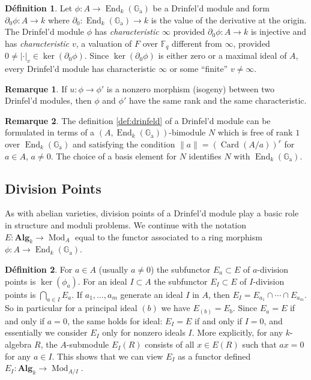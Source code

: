 \documentclass[12pt,a4paper]{article}
\theoremstyle{plain}
\theoremstyle{definition}
\newtheorem{definition}{D\'efinition}[section]
\newtheorem{remark}{Remarque}[section]
\theoremstyle{remark}
\DeclareMathOperator{\End}{End}
\DeclareMathOperator{\Card}{Card}
\DeclareMathOperator{\Mod}{Mod}
\newcommand{\bF}{\mathbb{F}}
\newcommand{\Ga}{\mathbb{G}_\mathrm{a}}
\providecommand{\Ga}{\mathbb{G}_{\mathrm a}}
\providecommand{\End}{\operatorname{End}}
\providecommand{\Alg}{\mathbf{Alg}}
\begin{document}
\begin{definition}
\label{def:characteristic}
Let $\phi: A \to \End_k(\Ga)$ be a Drinfel'd module and form $\partial_0 \phi: A \to k$ where $\partial_0: \End_k(\Ga) \to k$ is the value of the derivative at the origin. The Drinfel'd module $\phi$ has \emph{characteristic $\infty$} provided $\partial_0 \phi: A \to k$ is injective and has \emph{characteristic $v$}, a valuation of $F$ over $\bF_q$ different from $\infty$, provided $0 \neq |\cdot|_v \in \ker(\partial_0 \phi)$. Since $\ker(\partial_0 \phi)$ is either zero or a maximal ideal of $A$, every Drinfel'd module has characteristic $\infty$ or some ``finite'' $v \neq \infty$.
\end{definition}

\begin{remark}
\label{rem:samerank}
If $u: \phi \to \phi'$ is a nonzero morphism (isogeny) between two Drinfel'd modules, then $\phi$ and $\phi'$ have the same rank and the same characteristic.
\end{remark}

\begin{remark}
\label{rem:bimodule}
The definition \eqref{def:drinfeld} of a Drinfel'd module can be formulated in terms of a $(A, \End_k(\Ga))$-bimodule $N$ which is free of rank $1$ over $\End_k(\Ga)$ and satisfying the condition $\|a\| = (\Card(A/a))^r$ for $a \in A$, $a \neq 0$. The choice of a basis element for $N$ identifies $N$ with $\End_k(\Ga)$.
\end{remark}

\subsection{Division Points}
\label{sec:division}

As with abelian varieties, division points of a Drinfel'd module play a basic role in structure and moduli problems. We continue with the notation $E: \Alg_k \to \Mod_A$ equal to the functor associated to a ring morphism $\phi: A \to \End_k(\Ga)$.

\begin{definition}
\label{def:division}
For $a \in A$ (usually $a \neq 0$) the subfunctor $E_a \subset E$ of $a$-division points is $\ker(\phi_a)$. For an ideal $I \subset A$ the subfunctor $E_I \subset E$ of $I$-division points is $\bigcap_{a \in I} E_a$. If $a_1, \ldots, a_m$ generate an ideal $I$ in $A$, then $E_I = E_{a_1} \cap \cdots \cap E_{a_m}$. So in particular for a principal ideal $(b)$ we have $E_{(b)} = E_b$. Since $E_a = E$ if and only if $a = 0$, the same holds for ideal: $E_I = E$ if and only if $I = 0$, and essentially we consider $E_I$ only for nonzero ideals $I$. More explicitly, for any $k$-algebra $R$, the $A$-submodule $E_I(R)$ consists of all $x \in E(R)$ such that $ax = 0$ for any $a \in I$. This shows that we can view $E_I$ as a functor defined $E_I: \Alg_k \to \Mod_{A/I}$.
\end{definition}
\end{document}
